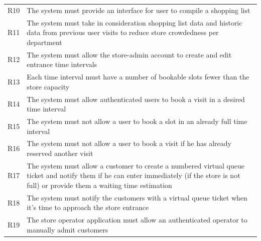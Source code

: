 \begin{tabular}{C{1cm}L{14.1cm}}
    R10   & The system must provide an interface for user to compile a shopping list                                                                                                                    \\
    R11   & The system must take in consideration shopping list data and historic data from previous user visits to reduce store crowdedness per department                                             \\
    R12   & The system must allow the store-admin account to create and edit entrance time intervals                                                                                                    \\
    R13   & Each time interval must have a number of bookable slots fewer than the store capacity                                                                                                       \\
    R14   & The system must allow authenticated users to book a visit in a desired time interval                                                                                                        \\
    R15   & The system must not allow a user to book a slot in an already full time interval                                                                                                            \\
    R16   & The system must not allow a user to book a visit if he has already reserved another visit                                                                                                   \\
    R17   & The system must allow a customer to create a numbered virtual queue ticket and notify them if he can enter immediately (if the store is not full) or provide them a waiting time estimation \\
    R18   & The system must notify the customers with a virtual queue ticket when it's time to approach the store entrance                                                                              \\
    R19   & The store operator application must allow an authenticated operator to manually admit customers                                                                                             \\
\end{tabular}

\vfill

